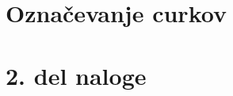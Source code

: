 \documentclass[slovene,11pt,a4paper]{article}
\begin{document}







\section*{Označevanje curkov}

\section*{2. del naloge}
\end{document}
